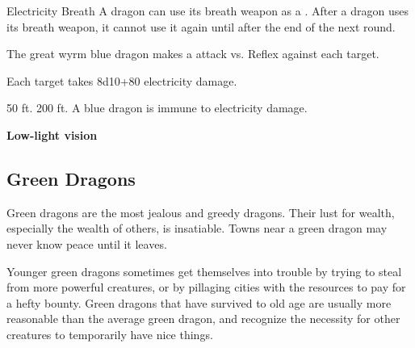     \begin{freeability}{Electricity Breath}
      A dragon can use its breath weapon as a .
      After a dragon uses its breath weapon, it cannot use it again until after the end of the next round.
      \par The great wyrm blue dragon makes a  attack
        vs. Reflex against each target.
    
    \hit Each target takes 8d10+80 electricity damage.
    \end{freeability}
  
      
       50 ft.
     200 ft.
     A blue dragon is immune to electricity damage.
    \par\noindent\textbf{Low-light vision}
  
  
    \subsection{Green Dragons}
      
      Green dragons are the most jealous and greedy dragons.
      Their lust for wealth, especially the wealth of others, is insatiable.
      Towns near a green dragon may never know peace until it leaves.
    
      Younger green dragons sometimes get themselves into trouble by trying to steal from more powerful creatures, or by pillaging cities with the resources to pay for a hefty bounty.
      Green dragons that have survived to old age are usually more reasonable than the average green dragon, and recognize the necessity for other creatures to temporarily have nice things.
    

